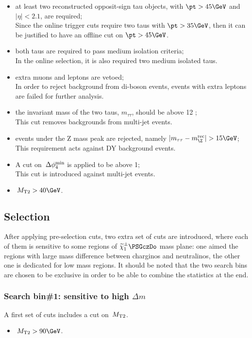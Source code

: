 \begin{itemize}
\item at least two reconstructed opposit-sign tau objects, with $\pt>45\GeV$ and $|\eta|<2.1$, are required;\\ Since the online trigger cuts require two taus with $\pt>35\GeV$, then it can be justified to have an offline cut on $\pt>45\GeV$. 
\item both taus are required to pass medium isolation criteria;\\ In the online selection, it is also required two medium isolated taus.
\item extra muons and leptons are vetoed;\\ In order to reject background from di-boson events, events with extra leptons are failed for further analysis.
\item the invariant mass of the two taus, $m_{\tau\tau}$, should be above 12 \GeV;\\ This cut removes backgrounds from multi-jet events. 
\item events under the Z mass peak are rejected, namely $|m_{\tau\tau}-m_{\Z}^{\rm rec}|>15\GeV$;\\ This requirement acts against DY background events. 
\item A cut on $\,{\Delta\phi_{4}^{\rm min}}$ is applied to be above 1;\\ This cut is introduced against multi-jet events.   
\item $\mttwo>40\GeV$. 
\end{itemize}
\subsection{Selection}
After applying pre-selection cuts, two extra set of cuts are introduced, where each of them is sensitive to some regions of $\chione\PSGczDo$ mass plane: one aimed the regions with large mass difference between charginos and neutralinos, the other one is dedicated for low mass regions. It should be noted that the two search bins are chosen to be exclusive in order to be able to combine the statistics at the end.
\subsubsection{Search bin\#1: sensitive to high $\Delta m$}
A first set of cuts includes a cut on $\,{M_{\rm T2}}$.
\begin{itemize}
\item $\mttwo>90\GeV$.
\end{itemize}
